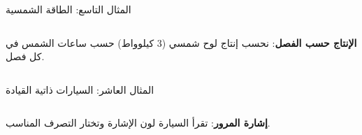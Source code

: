 \begin{frame}[t]{المثال التاسع: الطاقة الشمسية}
    \begin{columns}[T]
        {\small\textbf{الإنتاج حسب الفصل}: نحسب إنتاج لوح شمسي (3 كيلوواط) حسب ساعات الشمس في كل فصل.\par}
        \vspace{0.3cm}
    \end{columns}
\end{frame}

\begin{frame}[t]{المثال العاشر: السيارات ذاتية القيادة}
    \begin{columns}[T]
        {\small\textbf{إشارة المرور}: تقرأ السيارة لون الإشارة وتختار التصرف المناسب.\par}
        \vspace{0.3cm}
    \end{columns}
\end{frame}
